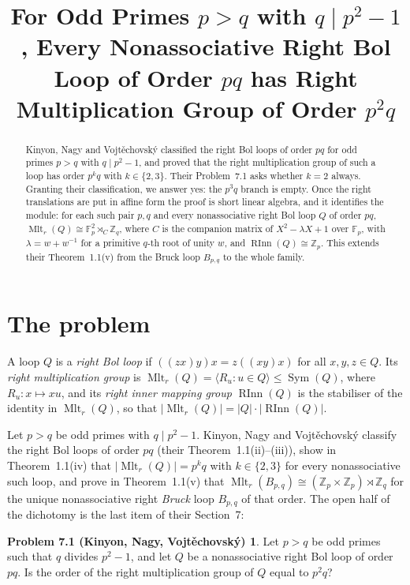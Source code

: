 \documentclass[11pt]{amsart}
\title[$|\Mltr|=p^{2}q$ for nonassociative right Bol loops of order $pq$]
{For Odd Primes $p>q$ with $q\mid p^{2}-1$, Every Nonassociative Right Bol Loop
of Order $pq$ has Right Multiplication Group of Order $p^{2}q$}
\date{}
\theoremstyle{definition}
\newtheorem*{problem}{Problem 7.1 (Kinyon, Nagy, Vojt\v{e}chovsk\'y)}
\newcommand{\Mltr}{\operatorname{Mlt}_r}
\newcommand{\RInn}{\operatorname{RInn}}
\newcommand{\FF}[1]{\mathbb F_{#1}}
\newcommand{\Zq}{\mathbb Z_q}
\begin{document}
\begin{abstract}
Kinyon, Nagy and Vojt\v{e}chovsk\'y classified the right Bol loops of order
$pq$ for odd primes $p>q$ with $q\mid p^{2}-1$, and proved that the right
multiplication group of such a loop has order $p^{k}q$ with $k\in\{2,3\}$.
Their Problem~7.1 asks whether $k=2$ always. Granting their classification, we
answer yes: the $p^{3}q$ branch is empty. Once the right translations are put
in affine form the proof is short linear algebra, and it identifies the module:
for each such pair $p,q$ and every nonassociative right Bol loop $Q$ of order
$pq$, $\Mltr(Q)\cong\FF p^{2}\rtimes_{C}\Zq$, where $C$ is the companion matrix of
$X^{2}-\lambda X+1$ over $\FF p$, with $\lambda=w+w^{-1}$ for a primitive
$q$-th root of unity $w$, and $\RInn(Q)\cong\mathbb Z_p$. This extends their
Theorem~1.1(v) from the Bruck loop $B_{p,q}$ to the whole family.
\end{abstract}

\maketitle

\section{The problem}

A loop $Q$ is a \emph{right Bol loop} if $((zx)y)x=z((xy)x)$ for all
$x,y,z\in Q$. Its \emph{right multiplication group} is
$\Mltr(Q)=\langle R_u:u\in Q\rangle\le\operatorname{Sym}(Q)$, where
$R_u\colon x\mapsto xu$, and its \emph{right inner mapping group} $\RInn(Q)$ is
the stabiliser of the identity in $\Mltr(Q)$, so that
$|\Mltr(Q)|=|Q|\cdot|\RInn(Q)|$.

Let $p>q$ be odd primes with $q\mid p^{2}-1$. Kinyon, Nagy and
Vojt\v{e}chovsk\'y \cite{KNV} classify the right Bol loops of order $pq$
(their Theorem~1.1(ii)--(iii)), show in Theorem~1.1(iv) that
$|\Mltr(Q)|=p^{k}q$ with $k\in\{2,3\}$ for every nonassociative such loop, and
prove in Theorem~1.1(v) that
$\Mltr(B_{p,q})\cong(\mathbb Z_p\times\mathbb Z_p)\rtimes\Zq$ for the unique
nonassociative right \emph{Bruck} loop $B_{p,q}$ of that order. The open half
of the dichotomy is the last item of their Section~7:

\begin{problem}
Let $p>q$ be odd primes such that $q$ divides $p^{2}-1$, and let $Q$ be a
nonassociative right Bol loop of order $pq$. Is the order of the right
multiplication group of $Q$ equal to $p^{2}q$?
\end{problem}
\end{document}
